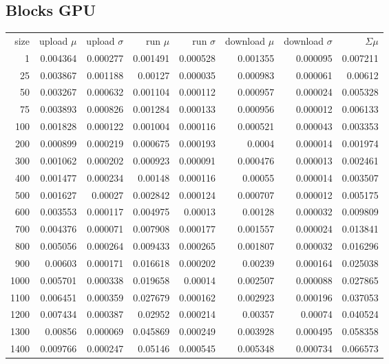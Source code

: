 \subsection*{Blocks GPU}

\begin{longtable}{r r r r r r r r}
size & upload $\mu$  & upload $\sigma$ & run $\mu$ & run $\sigma$ & download $\mu$ & download $\sigma$ & $\Sigma \mu$ \\
1 & 0.004364 & 0.000277 & 0.001491 & 0.000528 & 0.001355 & 0.000095 & 0.007211 \\
25 & 0.003867 & 0.001188 & 0.00127 & 0.000035 & 0.000983 & 0.000061 & 0.00612 \\
50 & 0.003267 & 0.000632 & 0.001104 & 0.000112 & 0.000957 & 0.000024 & 0.005328 \\
75 & 0.003893 & 0.000826 & 0.001284 & 0.000133 & 0.000956 & 0.000012 & 0.006133 \\
100 & 0.001828 & 0.000122 & 0.001004 & 0.000116 & 0.000521 & 0.000043 & 0.003353 \\
200 & 0.000899 & 0.000219 & 0.000675 & 0.000193 & 0.0004 & 0.000014 & 0.001974 \\
300 & 0.001062 & 0.000202 & 0.000923 & 0.000091 & 0.000476 & 0.000013 & 0.002461 \\
400 & 0.001477 & 0.000234 & 0.00148 & 0.000116 & 0.00055 & 0.000014 & 0.003507 \\
500 & 0.001627 & 0.00027 & 0.002842 & 0.000124 & 0.000707 & 0.000012 & 0.005175 \\
600 & 0.003553 & 0.000117 & 0.004975 & 0.00013 & 0.00128 & 0.000032 & 0.009809 \\
700 & 0.004376 & 0.000071 & 0.007908 & 0.000177 & 0.001557 & 0.000024 & 0.013841 \\
800 & 0.005056 & 0.000264 & 0.009433 & 0.000265 & 0.001807 & 0.000032 & 0.016296 \\
900 & 0.00603 & 0.000171 & 0.016618 & 0.000202 & 0.00239 & 0.000164 & 0.025038 \\
1000 & 0.005701 & 0.000338 & 0.019658 & 0.00014 & 0.002507 & 0.000088 & 0.027865 \\
1100 & 0.006451 & 0.000359 & 0.027679 & 0.000162 & 0.002923 & 0.000196 & 0.037053 \\
1200 & 0.007434 & 0.000387 & 0.02952 & 0.000214 & 0.00357 & 0.00074 & 0.040524 \\
1300 & 0.00856 & 0.000069 & 0.045869 & 0.000249 & 0.003928 & 0.000495 & 0.058358 \\
1400 & 0.009766 & 0.000247 & 0.05146 & 0.000545 & 0.005348 & 0.000734 & 0.066573 \\

\end{longtable}
